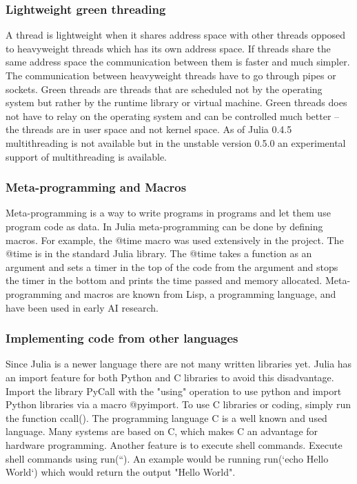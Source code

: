 \documentclass[a4paper,11pt]{article}
\begin{document}
\subsubsection{Lightweight green threading}
A thread is lightweight when it shares address space with other threads opposed to heavyweight threads which has its own address space. If threads share the same address space the communication between them is faster and much simpler. The communication between heavyweight threads have to go through pipes or sockets. Green threads are threads that are scheduled not by the operating system but rather by the runtime library or virtual machine. Green threads does not have to relay on the operating system and can be controlled much better – the threads are in user space and not kernel space. As of Julia 0.4.5 multithreading is not available but in the unstable version 0.5.0 an experimental support of multithreading is available. 

\subsubsection{Meta-programming and Macros}
Meta-programming is a way to write programs in programs and let them use program code as data. In Julia meta-programming can be done by defining macros. For example, the @time macro was used extensively in the project. The @time is in the standard Julia library. The @time takes a function as an argument and sets a timer in the top of the code from the argument and stops the timer in the bottom and prints the time passed and memory allocated. Meta-programming and macros are known from Lisp, a programming language, and have been used in early AI research. 

\subsubsection{Implementing code from other languages}
Since Julia is a newer language there are not many written libraries yet. Julia has an import feature for both Python and C libraries to avoid this disadvantage. Import the library PyCall with the "using" operation to use python and import Python libraries via a macro @pyimport. To use C libraries or coding, simply run the function ccall(). The programming language C is a well known and used language. Many systems are based on C, which makes C an advantage for hardware programming. Another feature is to execute shell commands. Execute shell commands using run(``). An example would be running run(`echo Hello World`) which would return the output "Hello World".
\end{document}
